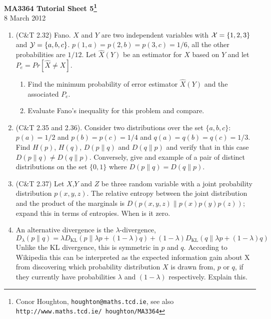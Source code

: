 \documentclass[12pt]{article}
\begin{document}
\begin{center}
{\bf MA3364 Tutorial Sheet 5\footnote{Conor Houghton, {\tt houghton@maths.tcd.ie}, see also {\tt http://www.maths.tcd.ie/ houghton/MA3364}}}\\[1cm]{} 8 March 2012
\end{center}
\begin{enumerate}

\item (C\&T 2.32) Fano. $X$ and $Y$ are two independent variables with ${\cal X}=\{1,2,3\}$ and ${\cal Y}=\{a,b,c\}$. $p(1,a)=p(2,b)=p(3,c)=1/6$, all the other probabilities are $1/12$. Let $\hat{X}(Y)$ be an estimator for $X$ based on $Y$ and let $P_e=Pr[\hat{X}\not=X]$.
\begin{enumerate}
\item Find the minimum probability of error estimator $\hat{X}(Y)$ and the associated $P_e$. 
\item Evaluate Fano's inequality for this problem and compare.
\end{enumerate}

\item (C\&T 2.35 and 2.36). Consider two distributions over the set
  $\{a,b,c\}$: $p(a)=1/2$ and $p(b)=p(c)=1/4$ and
  $q(a)=q(b)=q(c)=1/3$. Find $H(p)$, $H(q)$, $D(p\|q)$ and $D(q\|p)$
  and verify that in this case $D(p\|q)\not=D(q\|p)$. Conversely, give
  and example of a pair of distinct distributions on the set $\{0,1\}$
  where $D(p\|q)=D(q\|p)$.


\item (C\&T 2.37) Let $X$,$Y$ and $Z$ be three random variable with a joint probability distribution $p(x,y,z)$. The relative entropy between the joint distribution and the product of the marginals is $D(p(x,y,z)\|p(x)p(y)p(z))$; expand this in terms of entropies. When is it zero.

\item An alternative divergence is the $\lambda$-divergence,
\begin{equation}
D_{\lambda}(p\|q) = \lambda D_{\mathrm{KL}}(p\|\lambda p + (1-\lambda)q) + (1-\lambda) D_{\mathrm{KL}}(q\|\lambda p + (1-\lambda)q)
\end{equation}
Unlike the KL divergence, this is symmetric in $p$ and $q$. According to Wikipedia this can be interpreted as the expected information gain about X from discovering which probability distribution $X$ is drawn from, $p$ or $q$, if they currently have probabilities $\lambda$ and $(1-\lambda)$ respectively. Explain this.


\end{enumerate}
\end{document}
